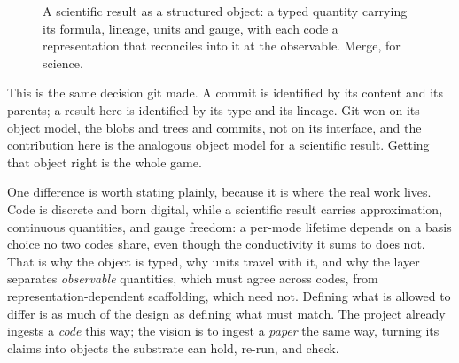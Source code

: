 \documentclass[11pt,a4paper]{article}
\begin{document}
\begin{figure}[h]
\centering
{}
\caption{A scientific result as a structured object: a typed quantity carrying its
formula, lineage, units and gauge, with each code a representation that reconciles
into it at the observable. Merge, for science.}
\end{figure}

This is the same decision git made. A commit is identified by its content and its
parents; a result here is identified by its type and its lineage. Git won on its
object model, the blobs and trees and commits, not on its interface, and the
contribution here is the analogous object model for a scientific result. Getting
that object right is the whole game.

One difference is worth stating plainly, because it is where the real work lives.
Code is discrete and born digital, while a scientific result carries approximation,
continuous quantities, and gauge freedom: a per-mode lifetime depends on a basis
choice no two codes share, even though the conductivity it sums to does not. That
is why the object is typed, why units travel with it, and why the layer separates
\emph{observable} quantities, which must agree across codes, from
representation-dependent scaffolding, which need not. Defining what is allowed to
differ is as much of the design as defining what must match. The project already
ingests a \emph{code} this way; the vision is to ingest a \emph{paper} the same
way, turning its claims into objects the substrate can hold, re-run, and check.
\end{document}
